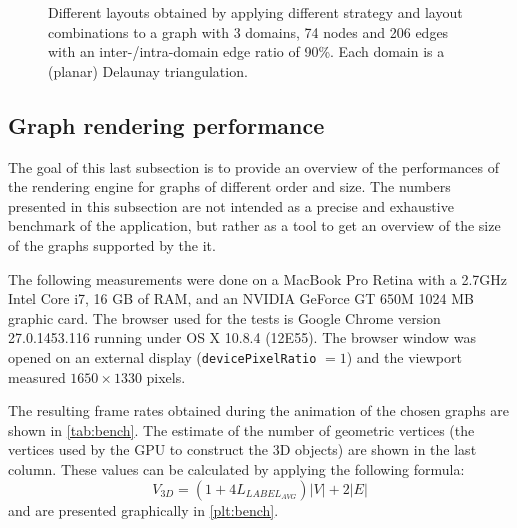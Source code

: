 {\begin{landscape}
\begin{figure}
{    }\hfill
    \caption[Different layouts for a graph with 3 domains, 74 nodes and 206 edges with a inter-/intra-domain edge ratio of 90\%.]{Different layouts obtained by applying different strategy and layout combinations to a graph with 3 domains, 74 nodes and 206 edges with an inter-/intra-domain edge ratio of 90\%. Each domain is a (planar) Delaunay triangulation.}%
    \label{fig:ex5}
    \clearpage
  \end{figure}
  \end{landscape}
    \cleartoodd
}


\subsection{Graph rendering performance}

The goal of this last subsection is to provide an overview of the performances of the rendering engine for graphs of different order and size. The numbers presented in this subsection are not intended as a precise and exhaustive benchmark of the application, but rather as a tool to get an overview of the size of the graphs supported by the it.

The following measurements were done on a MacBook Pro Retina with a 2.7GHz Intel Core i7, 16 GB of RAM, and an NVIDIA GeForce GT 650M 1024 MB graphic card. The browser used for the tests is Google Chrome version 27.0.1453.116 running under OS X 10.8.4 (12E55). The browser window was opened on an external display (\texttt{devicePixelRatio} $= 1$) and the viewport measured $1650\times1330$ pixels.

The resulting frame rates obtained during the animation of the chosen graphs are shown in \vref{tab:bench}. The estimate of the number of geometric vertices (the vertices used by the GPU to construct the 3D objects) are shown in the last column. These values can be calculated by applying the following formula:
\[
  V_{3D} = (1 + 4 L_{\mathit{LABEL}_\mathit{AVG}}) |V| + 2 |E|
\]
and are presented graphically in \vref{plt:bench}.


